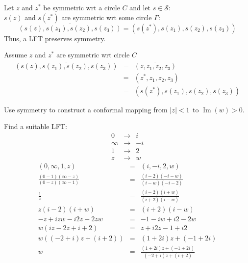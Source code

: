 \documentclass[letterpaper,12pt,fleqn]{article}
\newcommand{\conj}[1]{\overline{#1}}
\renewcommand{\S}{\mathcal{S}}
\newcommand{\G}{\Gamma}
\DeclareMathOperator{\im}{Im}
\begin{document}
\begin{theorem}
  Let $z$ and $z^*$ be symmetric wrt a circle $C$ and let $s\in\S$: \\
  $s(z)$ and $s(z^*)$ are symmetric wrt some circle $\G$:
  \[\conj{(s(z),s(z_1),s(z_2),s(z_3))}=(s(z^*),s(z_1),s(z_2),s(z_3))\]
  Thus, a LFT preserves symmetry.
\end{theorem}
\newpage
\begin{theproof}
  Assume $z$ and $z^*$ are symmetric wrt circle $C$
  \begin{eqnarray*}
    \conj{(s(z),s(z_1),s(z_2),s(z_3))} &=& \conj{(z,z_1,z_2,z_3)} \\
    &=& (z^*,z_1,z_2,z_3) \\
    &=& (s(z^*),s(z_1),s(z_2),s(z_3))
  \end{eqnarray*}
\end{theproof}

\begin{example}
  Use symmetry to construct a conformal mapping from $\lvert z\rvert<1$ to
  $\im(w)>0$.

  Find a suitable LFT:
  \begin{eqnarray*}
    0 &\to& i \\
    \infty &\to& -i \\
    1 &\to& 2 \\
    z &\to& w
  \end{eqnarray*}
  \begin{eqnarray*}
    (0,\infty,1,z) &=& (i,-i,2,w) \\
    \frac{(0-1)(\infty-z)}{(0-z)(\infty-1)} &=&
    \frac{(i-2)(-i-w)}{(i-w)(-i-2)} \\
    \frac{1}{z} &=& \frac{(i-2)(i+w)}{(i+2)(i-w)} \\
    z(i-2)(i+w) &=& (i+2)(i-w) \\
    -z+izw-i2z-2zw &=& -1-iw+i2-2w \\
    w(iz-2z+i+2) &=& z+i2z-1+i2 \\
    w((-2+i)z+(i+2)) &=& (1+2i)z+(-1+2i) \\
    w &=& \frac{(1+2i)z+(-1+2i)}{(-2+i)z+(i+2)}
  \end{eqnarray*}
\end{example}
\end{document}
